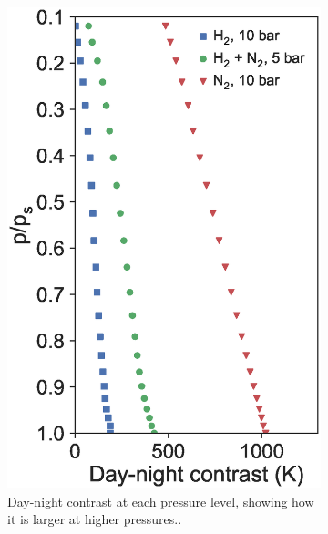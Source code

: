 \begin{figure}
\begin{subfigure}[t]{0.32\textwidth}
    \includegraphics[width=\textwidth]{figures/linking-climate-55cnce/dncontrast.eps}
    \caption{Day-night contrast at each pressure level, showing how it is larger at higher pressures..}
    \label{fig:dnc-pressure}
  \end{subfigure}
\enskip
  \begin{subfigure}[t]{0.32\textwidth}

\end{subfigure}
\end{figure}
